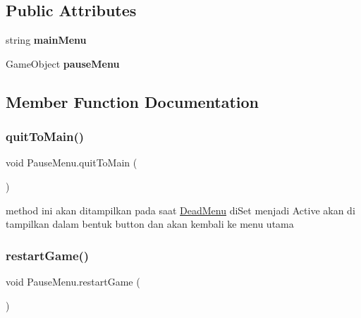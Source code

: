 \subsection*{Public Attributes}
\begin{DoxyCompactItemize}
\item 
\hypertarget{class_pause_menu_ab66fa055eeaf9ed2236f89d7192e9d84}{}\label{class_pause_menu_ab66fa055eeaf9ed2236f89d7192e9d84} 
string {\bfseries main\+Menu}
\item 
\hypertarget{class_pause_menu_a2a4732fd962c6aa136a867be16b71cc2}{}\label{class_pause_menu_a2a4732fd962c6aa136a867be16b71cc2} 
Game\+Object {\bfseries pause\+Menu}
\end{DoxyCompactItemize}


\subsection{Member Function Documentation}
\hypertarget{class_pause_menu_abd6872204e8867b9823bce94cbb36b54}{}\label{class_pause_menu_abd6872204e8867b9823bce94cbb36b54} 
\subsubsection{\texorpdfstring{quit\+To\+Main()}{quitToMain()}}
{\footnotesize\ttfamily void Pause\+Menu.\+quit\+To\+Main (\begin{DoxyParamCaption}{ }\end{DoxyParamCaption})}



method ini akan ditampilkan pada saat \hyperlink{class_dead_menu}{Dead\+Menu} di\+Set menjadi Active akan di tampilkan dalam bentuk button dan akan kembali ke menu utama 

\hypertarget{class_pause_menu_ac64b5f82050f56e6553e7b60e926c1ed}{}\label{class_pause_menu_ac64b5f82050f56e6553e7b60e926c1ed} 
\subsubsection{\texorpdfstring{restart\+Game()}{restartGame()}}
{\footnotesize\ttfamily void Pause\+Menu.\+restart\+Game (\begin{DoxyParamCaption}{ }\end{DoxyParamCaption})}



